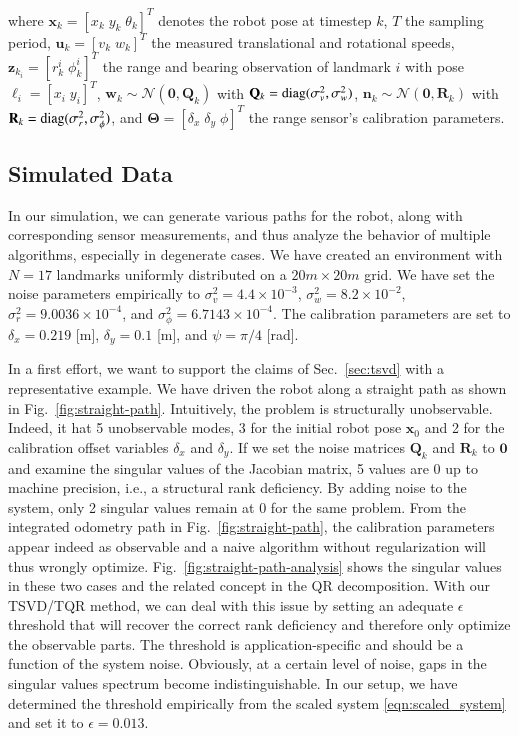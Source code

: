 \noindent where $\mathbf{x}_k=[x_k\;y_k\;\theta_k]^T$ denotes the robot pose at
timestep $k$, $T$ the sampling period, $\mathbf{u}_k=[v_k\;w_k]^T$ the measured
translational and rotational speeds, $\mathbf{z}_{k_i}=[r_k^i\;\phi_k^i]^T$ the
range and bearing observation of landmark $i$ with pose
$\boldsymbol{\ell}_i=[x_i\;y_i]^T$, $\mathbf{w}_k\sim\mathcal{N}(\mathbf{0},
\mathbf{Q}_k)$ with $\mathbf{Q}_k=\operatorname{diag}(\sigma^2_v,\sigma^2_w)$,
$\mathbf{n}_k\sim\mathcal{N}(\mathbf{0}, \mathbf{R}_k)$ with
$\mathbf{R}_k=\operatorname{diag}(\sigma^2_r,\sigma^2_\phi)$, and
$\mathbf{\Theta}=[\delta_x\;\delta_y\;\phi]^T$ the range sensor's calibration
parameters.

\subsection{Simulated Data}

In our simulation, we can generate various paths for the robot, along with
corresponding sensor measurements, and thus analyze the behavior of multiple
algorithms, especially in degenerate cases. We have created an environment
with $N=17$ landmarks uniformly distributed on a $20m\times 20m$ grid. We have
set the noise parameters empirically to $\sigma^2_v=4.4\times 10^{-3}$,
$\sigma^2_w=8.2\times 10^{-2}$, $\sigma^2_r=9.0036\times 10^{-4}$, and
$\sigma^2_\phi=6.7143\times 10^{-4}$. The calibration parameters are set to
$\delta_x=0.219$ [m], $\delta_y=0.1$ [m], and $\psi=\pi/4$ [rad].

In a first effort, we want to support the claims of Sec.~\ref{sec:tsvd} with
a representative example. We have driven the robot along a straight
path as shown in Fig.~\ref{fig:straight-path}. Intuitively, the problem is
structurally unobservable. Indeed, it hat 5 unobservable modes, 3 for the
initial robot pose $\mathbf{x}_0$ and 2 for the calibration offset variables
$\delta_x$ and $\delta_y$. If we set the noise matrices $\mathbf{Q}_k$ and
$\mathbf{R}_k$ to $\mathbf{0}$ and examine the singular values of the Jacobian
matrix, 5 values are $0$ up to machine precision, i.e., a structural rank
deficiency. By adding noise to the system, only 2 singular values remain at $0$
for the same problem. From the integrated odometry path in
Fig.~\ref{fig:straight-path}, the calibration parameters appear indeed as
observable and a naive algorithm without regularization will thus wrongly
optimize. Fig.~\ref{fig:straight-path-analysis} shows the singular values in
these two cases and the related concept in the QR decomposition. With our
TSVD/TQR method, we can deal with this issue by setting an adequate $\epsilon$
threshold that will recover the correct rank deficiency and therefore only
optimize the observable parts. The threshold is application-specific and should
be a function of the system noise. Obviously, at a certain level of noise, gaps
in the singular values spectrum become indistinguishable. In our setup, we have
determined the threshold empirically from the scaled system
\eqref{eqn:scaled_system} and set it to $\epsilon=0.013$.

